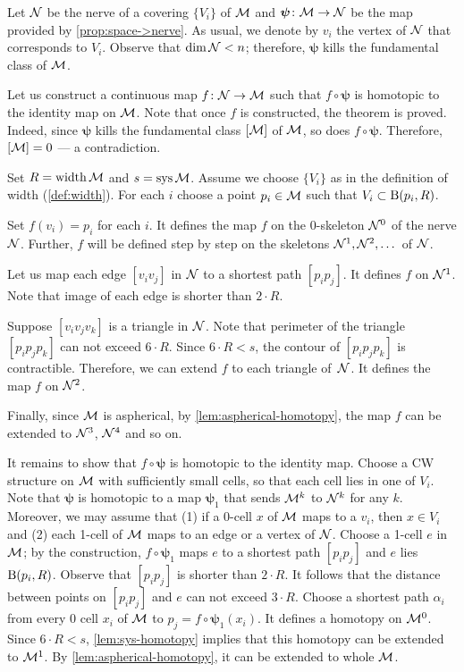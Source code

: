 Let $\mathcal{N}$ be the nerve of a covering $\{V_i\}$ of $\mathcal{M}$ and $\bm{\psi}\colon\mathcal{M}\to\mathcal{N}$ be the map provided by \ref{prop:space->nerve}.
As usual, we denote by $v_i$ the vertex of $\mathcal{N}$ that corresponds to $V_i$.
Observe that $\operatorname{\rm dim}\nolimits\mathcal{N}<n$;
therefore, $\bm{\psi}$ kills the fundamental class of $\mathcal{M}$.

Let us construct a continuous map  $f\colon\mathcal{N}\to  \mathcal{M}$ such that
$f\circ\bm{\psi}$ is homotopic to the identity map on $\mathcal{M}$.
Note that once $f$ is constructed, the theorem is proved.
Indeed, since $\bm{\psi}$ kills the fundamental class $[\mathcal{M}]$ of $\mathcal{M}$, so does $f\circ\bm{\psi}$.
Therefore, $[\mathcal{M}]=0$ --- a contradiction.

Set $R=\operatorname{\rm width}\nolimits \mathcal{M}$ and $s=\mathop{\rm sys}\nolimits\mathcal{M}$.
Assume we choose $\{V_i\}$ as in the definition of width (\ref{def:width}).
For each $i$ choose a point $p_i\in \mathcal{M}$ such that $V_i\subset \mathrm{B}{}(p_i,R)$.

Set $f(v_i)=p_i$ for each $i$.
It defines the map $f$ on the 0-skeleton $\mathcal{N}^0$ of the nerve $\mathcal{N}$.
Further, $f$ will be defined step by step on the skeletons $\mathcal{N}^1,\mathcal{N}^2, \dots$ of $\mathcal{N}$.

Let us map each edge $[v_iv_j]$ in $\mathcal{N}$ to a shortest path $[p_ip_j]$.
It defines $f$ on $\mathcal{N}^1$.
Note that image of each edge is shorter than $2\cdot R$.

Suppose $[v_iv_jv_k]$ is a triangle in $\mathcal{N}$.
Note that perimeter of the triangle $[p_ip_jp_k]$ can not exceed $6\cdot R$.
Since $6\cdot R<s$, the contour of $[p_ip_jp_k]$ is contractible.
Therefore, we can extend $f$ to each triangle of~$\mathcal{N}$.
It defines the map $f$ on $\mathcal{N}^2$.

Finally, since $\mathcal{M}$ is aspherical, by \ref{lem:aspherical-homotopy}, the map $f$ can be extended to $\mathcal{N}^3$, $\mathcal{N}^4$ and so on.

It remains to show that $f\circ\bm{\psi}$ is homotopic to the identity map.
Choose a CW structure on $\mathcal{M}$ with sufficiently small cells, so that each cell lies in one of $V_i$.
Note that $\bm{\psi}$ is homotopic to a map $\bm{\psi}_1$ that sends $\mathcal{M}^k$ to $\mathcal{N}^k$ for any $k$.
Moreover, we may assume that (1) if a 0-cell $x$ of $\mathcal{M}$ maps to a $v_i$, then $x\in V_i$ and (2) each 1-cell  of $\mathcal{M}$ maps to an edge or a vertex of $\mathcal{N}$.
Choose a 1-cell $e$ in $\mathcal{M}$; by the construction, $f\circ\bm{\psi}_1$ maps $e$ to a shortest path $[p_ip_j]$ and $e$ lies $\mathrm{B}{}(p_i,R)$.
Observe that $[p_ip_j]$ is shorter than $2\cdot R$.
It follows that the distance between points on $[p_ip_j]$ and $e$ can not exceed $3\cdot R$.
Choose a shortest path $\alpha_i$ from every 0 cell $x_i$  of $\mathcal{M}$ to $p_j=f\circ\bm{\psi}_1(x_i)$.
It defines a homotopy on $\mathcal{M}^0$.
Since $6\cdot R<s$, \ref{lem:sys-homotopy} implies that this homotopy can be extended to $\mathcal{M}^1$.
By \ref{lem:aspherical-homotopy}, it can be extended to whole $\mathcal{M}$.
\qeds

